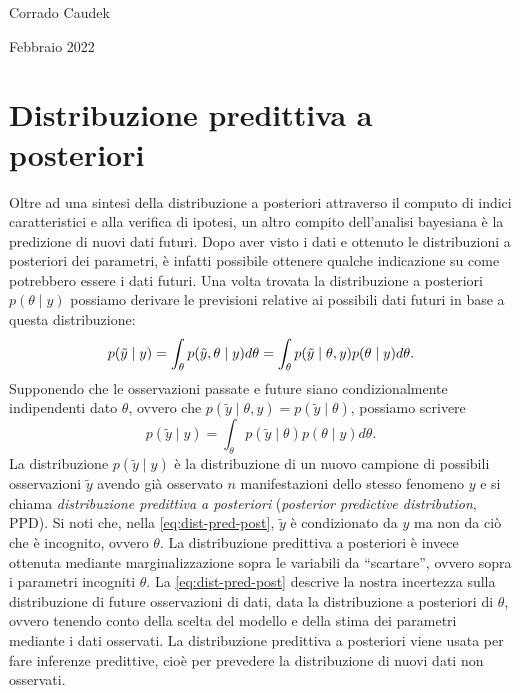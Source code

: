 \documentclass[
  10pt,
  italian,
  a4paper,
  extrafontsizes,onecolumn,openright
  ]{memoir}
\begin{document}
\bigskip

Corrado Caudek

\bigskip

Febbraio 2022

\mainmatter

\hypertarget{chapter-ppc}{%
\chapter{Distribuzione predittiva a posteriori}\label{chapter-ppc}}

Oltre ad una sintesi della distribuzione a posteriori attraverso il computo di indici caratteristici e alla verifica di ipotesi, un altro compito dell'analisi bayesiana è la predizione di nuovi dati futuri. Dopo aver visto i dati e ottenuto le distribuzioni a posteriori dei parametri, è infatti possibile ottenere qualche indicazione su come potrebbero essere i dati futuri. Una volta trovata la distribuzione a posteriori \(p(\theta \mid y)\) possiamo derivare le previsioni relative ai possibili dati futuri in base a questa distribuzione:
\begin{equation}
p(\tilde{y} \mid y) = \int_{\theta} p(\tilde{y}, \theta \mid y) d \theta = \int_{\theta} p(\tilde{y} \mid \theta, y) p(\theta \mid y) d\theta.\notag
\end{equation}
\noindent
Supponendo che le osservazioni passate e future siano condizionalmente indipendenti dato \(\theta\), ovvero che \(p(\tilde{y} \mid \theta, y) = p(\tilde{y} \mid \theta)\), possiamo scrivere
\begin{equation}
p(\tilde{y} \mid y) = \int_{\theta} p(\tilde{y} \mid \theta) p(\theta \mid y) d\theta.
\label{eq:dist-pred-post}
\end{equation}
\noindent
La distribuzione \(p(\tilde{y} \mid y)\) è la distribuzione di un nuovo campione di possibili osservazioni \(\tilde{y}\) avendo già osservato \(n\) manifestazioni dello stesso fenomeno \(y\) e si chiama \emph{distribuzione predittiva a posteriori} (\emph{posterior predictive distribution}, PPD). Si noti che, nella \eqref{eq:dist-pred-post}, \(\tilde{y}\) è condizionato da \(y\) ma non da ciò che è incognito, ovvero \(\theta\). La distribuzione predittiva a posteriori è invece ottenuta mediante marginalizzazione sopra le variabili da ``scartare'', ovvero sopra i parametri incogniti \(\theta\). La \eqref{eq:dist-pred-post} descrive la nostra incertezza sulla distribuzione di future osservazioni di dati, data la distribuzione a posteriori di \(\theta\), ovvero tenendo conto della scelta del modello e della stima dei parametri mediante i dati osservati. La distribuzione predittiva a posteriori viene usata per fare inferenze predittive, cioè per prevedere la distribuzione di nuovi dati non osservati.
\end{document}
